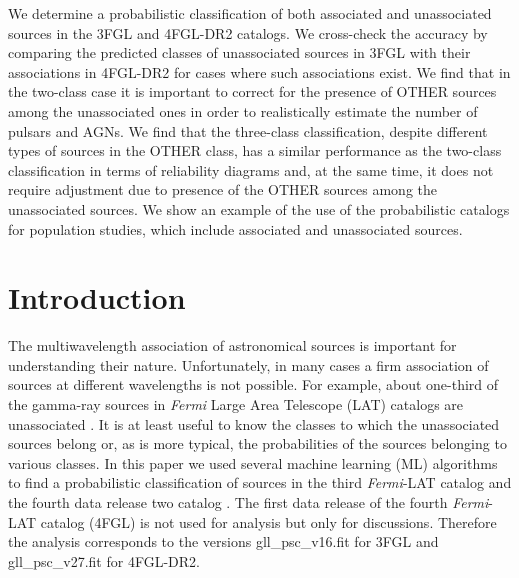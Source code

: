 \documentclass[referee]{aa} %
\newcommand{\Fermi}{\textit{Fermi}\xspace}
\begin{document}
{
We determine a probabilistic classification of both associated and unassociated sources in the 3FGL and 4FGL-DR2 catalogs.
We cross-check the accuracy by comparing the predicted classes of unassociated sources in 3FGL with their associations in 4FGL-DR2 for cases where such associations exist.
We find that in the two-class case it is important to correct for the presence of OTHER sources among the unassociated ones in order to realistically estimate the number of pulsars and AGNs.
We find that the three-class classification, despite different types of sources in the OTHER class, has a similar performance as the two-class classification in terms of reliability diagrams and, at the same time, it does not require adjustment due to presence of the OTHER sources among the unassociated sources.
We show an example of the use of the probabilistic catalogs for population studies, which include associated and 
unassociated sources.
}
{}


\maketitle


\section{Introduction}

The multiwavelength association of astronomical sources is important for understanding their nature.
Unfortunately, in many cases a firm association of sources at different wavelengths is not possible.
For example, about one-third of the gamma-ray sources in \Fermi Large Area Telescope (LAT) catalogs are unassociated
\citep{2010ApJS..188..405A, 2012ApJS..199...31N, 2015ApJS..218...23A, 2020ApJS..247...33A}.
It is at least useful to know the classes to which the unassociated sources belong or, as is more typical,
the probabilities of the sources belonging to various classes.
In this paper we used several machine learning (ML) algorithms to find a probabilistic classification of
 sources in the third \Fermi-LAT catalog \citep[3FGL;][]{2015ApJS..218...23A} and the fourth data release two catalog
\citep[4FGL-DR2;][]{2020ApJS..247...33A, 2020arXiv200511208B}. The first data release of the fourth \Fermi-LAT catalog (4FGL) is not used for analysis but only for discussions. Therefore the analysis corresponds to the versions gll\_psc\_v16.fit for 3FGL
and gll\_psc\_v27.fit for 4FGL-DR2.
\end{document}
